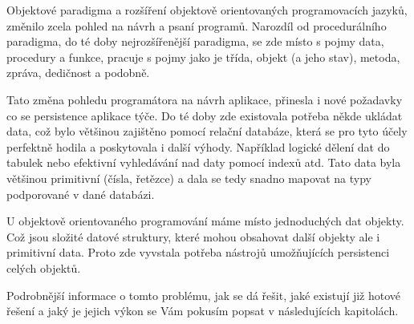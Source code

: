 Objektové paradigma a rozšíření objektově orientovaných programovacích jazyků, změnilo zcela pohled na návrh a psaní programů. Narozdíl od procedurálního paradigma, do té doby nejrozšířenější paradigma, se zde místo s pojmy data, procedury a funkce, pracuje s pojmy jako je třída, objekt (a jeho stav), metoda, zpráva, dedičnost a podobně.

Tato změna pohledu programátora na návrh aplikace, přinesla i nové požadavky co se persistence aplikace týče. Do té doby zde existovala potřeba někde ukládat data, což bylo většinou zajištěno pomocí relační databáze, která se pro tyto účely perfektně hodila a poskytovala i další výhody. Například logické dělení dat do tabulek nebo efektivní vyhledávání nad daty pomocí indexů atd. Tato data byla většinou primitivní (čísla, řetězce) a dala se tedy snadno mapovat na typy podporované v dané databázi.

U objektově orientovaného programování máme místo jednoduchých dat objekty. Což jsou složité datové struktury, které mohou obsahovat další objekty ale i primitivní data. Proto zde vyvstala potřeba nástrojů umožňujících persistenci celých objektů.

Podrobnější informace o tomto problému, jak se dá řešit, jaké existují již hotové řešení a jaký je jejich výkon se Vám pokusím popsat v následujících kapitolách.
